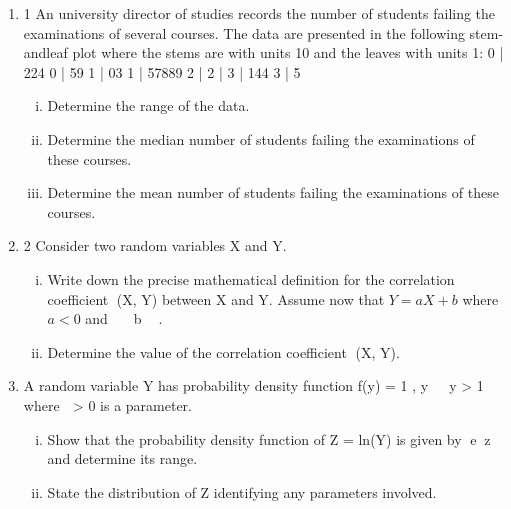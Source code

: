 \documentclass[a4paper,12pt]{article}
\begin{document}
\begin{enumerate}
\item 1 An university director of studies records the number of students failing the
examinations of several courses. The data are presented in the following stem-andleaf
plot where the stems are with units 10 and the leaves with units 1:
  0 | 224
0 | 59
1 | 03
1 | 57889
2 |
  2 |
  3 | 144
3 | 5
\begin{enumerate}[(i)]
\item Determine the range of the data. 
\item Determine the median number of students failing the examinations of these courses. 
\item Determine the mean number of students failing the examinations of these courses. 
\end{enumerate}
\item 2 Consider two random variables X and Y.
\begin{enumerate}[(i)]
\item Write down the precise mathematical definition for the correlation coefficient
(X, Y) between X and Y. 
Assume now that $Y = aX + b$ where $a < 0$ and   b  .
\item Determine the value of the correlation coefficient (X, Y). 
\end{enumerate}
\item  %

A random variable Y has probability density function
f(y) = 1 ,
y

y > 1
where  > 0 is a parameter.
\begin{enumerate}[(i)]
\item  Show that the probability density function of Z = ln(Y) is given by ez and determine its range.
\item State the distribution of Z identifying any parameters involved. 
\end{enumerate}

\end{enumerate}
\newpage
\end{document}
